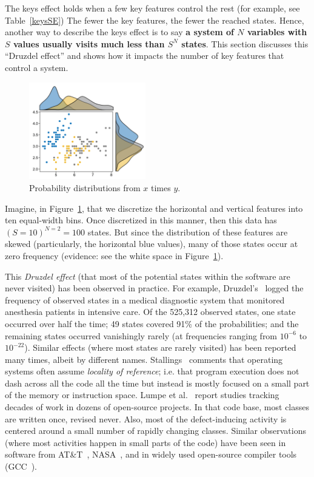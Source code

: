  

The keys effect
holds when a few key features control the rest (for example, see
Table~\ref{keysSE})
The fewer the key features, the fewer the reached states.
Hence, another way to describe the keys effect is to say
{\bf a system of $N$ variables with $S$ values
usually visits much less than $S^N$ 
states}. This section
discusses this ``Druzdel effect''
and shows how it impacts the number
of key features that control a system.




\begin{figure}
\begin{center}
 \includegraphics[width=2in]{fig/dist.png}
 \end{center}
 \caption{Probability distributions from $x$ times $y$.}\label{joint}
\end{figure}  Imagine, in Figure~\ref{joint}, that  we
discretize the horizontal and vertical features into ten equal-width bins.
Once discretized in this manner,   then  this data
has \mbox{$(S=10)^{N=2}=100$} states. But since the distribution of these features are skewed (particularly, the horizontal blue values), many of those  
states occur at zero frequency
(evidence: see   the white space in
Figure~\ref{joint}). 

This {\em Druzdel effect}
(that most of the potential states within the software are never visited)
has been observed in practice.
For example, Druzdel's~\cite{druzdzel2013properties} 
logged the frequency of observed states in  
a medical diagnostic system that monitored anesthesia patients in intensive care. 
Of the 525,312 observed states, one state occurred over half the time;
49 states covered 91\% of the probabilities; and the remaining states occurred vanishingly rarely
(at frequencies ranging from $10^{-6}$ to $10^{-22}$).
Similar effects (where most  states  
are rarely visited) has been reported many times, albeit by different names.
Stallings~\cite{stallings09} comments that operating systems often assume
{\em  locality of  reference};
 i.e. that  program
 execution does not dash across  all the code
 all the time but instead is mostly
 focused  on a small part of
 the memory or instruction space.
 Lumpe et al.~\cite{lumpe2012learning} report  studies tracking decades of  work in dozens  of  open-source projects. In  that code base,
 most classes are written once, revised never. Also, most  of  the  defect-inducing
 activity is centered around a small number of rapidly changing classes. Similar observations (where most activities happen in  small parts  of the code)  have been seen in software from AT\&T~\cite{Ostrand04}, NASA~\cite{Hamill09},
 and in   widely used open-source compiler tools (GCC~\cite{Hamill09}). 
 

